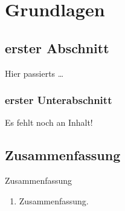 \chapter{Grundlagen}


\website

\section{erster Abschnitt}

\begin{Frame}{Hier passierts}
  \ldots
\end{Frame}

\subsection{erster Unterabschnitt}

\begin{Frame}
  Es fehlt noch an Inhalt!
\end{Frame}

\section*{Zusammenfassung}

\begin{frame}{Zusammenfassung}
  \begin{enumerate}
    \item Zusammenfassung.
  \end{enumerate}
\end{frame}